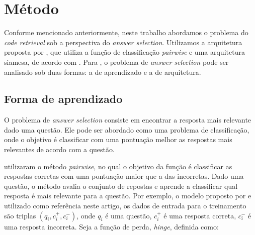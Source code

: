 \documentclass[12pt]{article}
\begin{document}






\section{Método} \label{sec:metodo}

Conforme mencionado anteriormente, neste trabalho abordamos o problema do \textit{code retrieval} sob a perspectiva do \textit{answer selection}. Utilizamos 
a arquitetura proposta por \cite{tan-lstm-qa}, que utiliza a função de classificação \textit{pairwise} e uma arquitetura siamesa, de acordo com \cite{lai-etal-2018-review}. Para 
\cite{lai-etal-2018-review}, o problema de \textit{answer selection} pode ser analisado sob duas formas: a de aprendizado e a de arquitetura.

\subsection{Forma de aprendizado}

O problema de \textit{answer selection} consiste em encontrar a resposta mais relevante dado uma questão. Ele pode ser abordado como uma problema de classificação, onde
o objetivo é classificar com uma pontuação melhor as respostas mais relevantes de acordo com a questão.

\cite{tan-lstm-qa} utilizaram o método \textit{pairwise}, no qual o objetivo da função é classificar as respostas corretas com uma pontuação maior que a das incorretas. Dado uma questão,
o método avalia o conjunto de repostas e aprende a classificar qual resposta é mais relevante para a questão. Por exemplo, o modelo proposto por \cite{tan-lstm-qa} e utilizado como referência neste artigo, os dados de entrada para o treinamento
são triplas $(q_{i}, c_{i}^{+}, c_{i}^{-})$, onde $q_{i}$ é uma questão, $c_{i}^{+}$ é uma resposta correta, $c_{i}^{-}$ é uma resposta incorreta. Seja a função de perda, \textit{hinge}, definida como:
\end{document}
